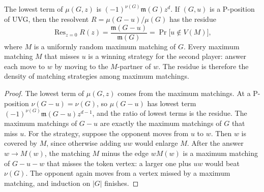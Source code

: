 \documentclass[final]{siamart0516}
\numberwithin{theorem}{section}
\numberwithin{equation}{section}
\theoremstyle{siamnonum}
\theoremstyle{plain}
\newcommand{\mm}{\mathfrak{m}}            %
\newcommand{\Res}{\operatorname{Res}}
\begin{document}
\begin{proposition}\label{prop:residue}
The lowest term of $\mu(G,z)$ is $(-1)^{\nu(G)}\mm(G)z^d$. If $(G,u)$ is a P-position of UVG, then the resolvent $R=\mu(G-u)/\mu(G)$ has the residue
\[
\Res_{z=0}R(z)=\frac{\mm(G-u)}{\mm(G)}=\Pr\bigl[u\notin V(M)\bigr],
\]
where $M$ is a uniformly random maximum matching of $G$.
Every maximum matching $M$ that misses $u$ is a winning strategy for the second player: answer each move to $w$ by moving to the $M$-partner of $w$. The residue is therefore the density of matching strategies among maximum matchings.
\end{proposition}
\begin{proof}
The lowest term of $\mu(G,z)$ comes from the maximum matchings. At a P-position $\nu(G-u)=\nu(G)$, so $\mu(G-u)$ has lowest term $(-1)^{\nu(G)}\mm(G-u)z^{d-1}$, and the ratio of lowest terms is the residue. The maximum matchings of $G-u$ are exactly the maximum matchings of $G$ that miss $u$. For the strategy, suppose the opponent moves from $u$ to $w$. Then $w$ is covered by $M$, since otherwise adding $uw$ would enlarge $M$. After the answer $w\to M(w)$, the matching $M$ minus the edge $wM(w)$ is a maximum matching of $G-u-w$ that misses the token vertex: a larger one plus $uw$ would beat $\nu(G)$. The opponent again moves from a vertex missed by a maximum matching, and induction on $|G|$ finishes.
\end{proof}
\end{document}
